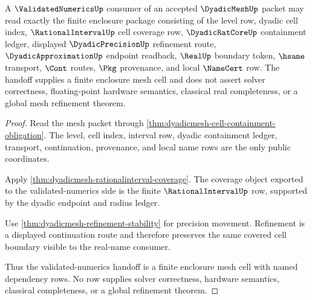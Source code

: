 \begin{theorem}
\label{thm:dyadicmesh-validatednumerics-handoff}
A $\ValidatedNumericsUp$ consumer of an accepted $\DyadicMeshUp$ packet may read exactly the finite enclosure package consisting of the level row, dyadic cell index, $\RationalIntervalUp$ cell coverage row, $\DyadicRatCoreUp$ containment ledger, displayed $\DyadicPrecisionUp$ refinement route, $\DyadicApproximationUp$ endpoint readback, $\RealUp$ boundary token, $\hsame$ transport, $\Cont$ routes, $\Pkg$ provenance, and local $\NameCert$ row. The handoff supplies a finite enclosure mesh cell and does not assert solver correctness, floating-point hardware semantics, classical real completeness, or a global mesh refinement theorem.
\end{theorem}
\begin{proof}
Read the mesh packet through \autoref{thm:dyadicmesh-cell-containment-obligation}. The level, cell index, interval row, dyadic containment ledger, transport, continuation, provenance, and local name rows are the only public coordinates.

Apply \autoref{thm:dyadicmesh-rationalinterval-coverage}. The coverage object exported to the validated-numerics side is the finite $\RationalIntervalUp$ row, supported by the dyadic endpoint and radius ledger.

Use \autoref{thm:dyadicmesh-refinement-stability} for precision movement. Refinement is a displayed continuation route and therefore preserves the same covered cell boundary visible to the real-name consumer.

Thus the validated-numerics handoff is a finite enclosure mesh cell with named dependency rows. No row supplies solver correctness, hardware semantics, classical completeness, or a global refinement theorem.
\end{proof}

